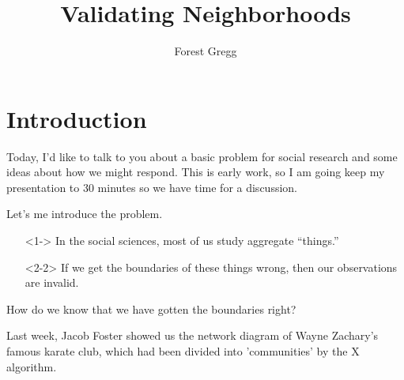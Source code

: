 \usepackage[english]{babel}
\usepackage{tikz}
\title{Validating Neighborhoods}
\author{Forest Gregg}

\mode*
\maketitle

\section{Introduction}
Today, I'd like to talk to you about a basic problem for social
research and some ideas about how we might respond. This is early
work, so I am going keep my presentation to 30 minutes so we have time
for a discussion.

Let's me introduce the problem.

\begin{frame}
\begin{itemize}{}
\item[]<1-> In the social sciences, most of us study aggregate ``things.''
  \pause
\item[]<2-2> If we get the boundaries of these things wrong, then our
  observations are invalid.
\end{itemize}
\end{frame}

\begin{frame}
\begin{center}
How do we know that we have gotten the boundaries right?
\end{center}
\end{frame}



Last week, Jacob Foster showed us the network diagram of Wayne
Zachary's famous karate club, which had been divided into
'communities' by the X algorithm. 




